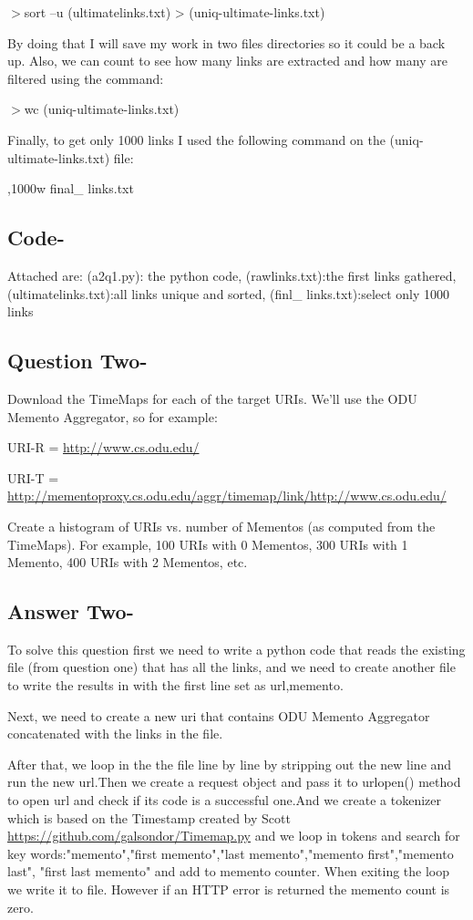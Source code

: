 \documentclass[letterpaper,11pt]{article}
\begin{document}
$>$sort –u (ultimatelinks.txt) > (uniq-ultimate-links.txt)

By doing that I will save my work in two files directories so it could be a back up.
Also, we can count to see how many links are extracted and how many are filtered using the command:

$>$wc (uniq-ultimate-links.txt)

Finally, to get only 1000 links I used the following command on the (uniq-ultimate-links.txt) file:

,1000w final\_ links.txt


\subsection*{Code-}
Attached are:
(a2q1.py): the python code, 
(rawlinks.txt):the first links gathered, 
(ultimatelinks.txt):all links unique and sorted, 
(finl\_ links.txt):select only 1000 links
\pagebreak


\subsection*{Question Two-}

Download the TimeMaps for each of the target URIs.  We'll use the ODU 
Memento Aggregator, so for example:

URI-R = \url{http://www.cs.odu.edu/}

URI-T = \url{http://mementoproxy.cs.odu.edu/aggr/timemap/link/http://www.cs.odu.edu/}

Create a histogram of URIs vs. number of Mementos (as computed from
the TimeMaps).  For example, 100 URIs with 0 Mementos, 300 URIs
with 1 Memento, 400 URIs with 2 Mementos, etc.

\subsection*{Answer Two-}

To solve this question first we need to write a python code that reads the existing file (from question one) that has all the links, and we need to create another file to write the results in with the first line set as url,memento.

Next, we need to create a new uri that contains ODU Memento Aggregator concatenated with the links in the file.

After that, we loop in the the file line by line by stripping out the new line and run the new url.Then we create a request object and pass it to urlopen() method to open url and check if its code is a successful one.And we create a tokenizer which is based on  
the Timestamp created by Scott \url{https://github.com/galsondor/Timemap.py} and we loop in tokens and search for key words:{"memento","first memento","last memento","memento first","memento last", "first last memento"} and add to memento counter. When exiting the loop we write it to file.
However if an HTTP error is returned the memento count is zero.
\end{document}
